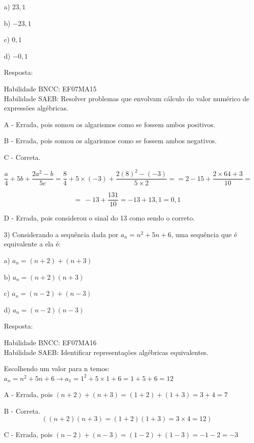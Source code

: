 a) \(23,1\)

b) \(- 23,1\)

c) \(0,1\)

d) \(- 0,1\)

Resposta:

Habilidade BNCC: EF07MA15\\
Habilidade SAEB: Resolver problemas que envolvam cálculo do valor
numérico de expressões algébricas.

A - Errada, pois somou os algarismos como se fossem ambos positivos.

B - Errada, pois somou os algarismos como se fossem ambos negativos.

C - Correta.

\[\frac{a}{4} + 5b + \frac{2a^{2} - b}{5c} = \frac{8}{4} + 5 \times \left( - 3 \right) + \frac{2\left( 8 \right)^{2} - \left( - 3 \right)}{5 \times 2} = = 2 - 15 + \frac{2 \times 64 + 3}{10} =\]

\[= \  - 13 + \frac{131}{10} = - 13 + 13,1 = 0,1\]

D - Errada, pois considerou o sinal do 13 como sendo o correto.

3) Considerando a sequência dada por \(a_{n} = n^{2} + 5n + 6\), uma
sequência que é equivalente a ela é:

a) \(a_{n} = (n + 2) + (n + 3)\)

b) \(a_{n} = (n + 2)(n + 3)\)

c) \(a_{n} = (n - 2) + (n - 3)\)

d) \(a_{n} = (n - 2)(n - 3)\)

Resposta:

Habilidade BNCC: EF07MA16\\
Habilidade SAEB: Identificar representações algébricas equivalentes.

Escolhendo um valor para n
temos:\(a_{n} = n^{2} + 5n + 6 \rightarrow a_{1} = 1^{2} + 5 \times 1 + 6 = 1 + 5 + 6 = 12\ \)

A - Errada, pois
\(\left( n + 2 \right) + \left( n + 3 \right) = \left( 1 + 2 \right) + \left( 1 + 3 \right) = 3 + 4 = 7\)

B - Correta.
$$(( n + 2)(n + 3) = \left( 1 + 2 \right)\left( 1 + 3 \right) = 3 \times 4 = 12)$$


C - Errada, pois
\(\left( n - 2 \right) + \left( n - 3 \right) = \left( 1 - 2 \right) + \left( 1 - 3 \right) = - 1 - 2 = - 3\)

